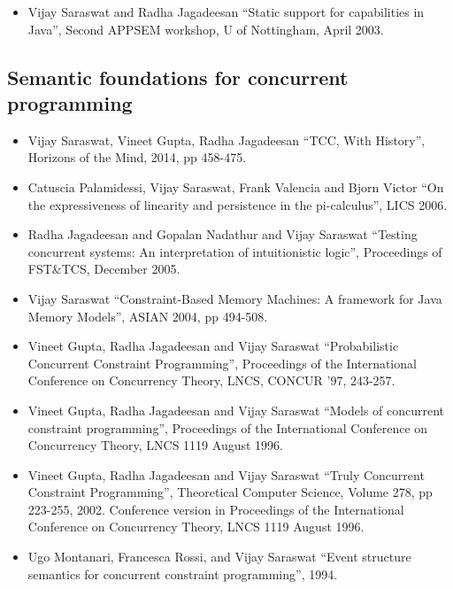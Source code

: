 \documentclass{article}
\begin{document}
\begin{itemize} 
\item Vijay Saraswat and Radha Jagadeesan ``Static support for
  capabilities in Java'', Second APPSEM workshop, U of Nottingham,
  April 2003. 
\end{itemize}

\subsection*{Semantic foundations for concurrent programming}
\begin{itemize} 
\item Vijay Saraswat, Vineet Gupta, Radha Jagadeesan ``TCC, With
  History'', Horizons of the Mind, 2014, pp 458-475.

\item Catuscia Palamidessi, Vijay Saraswat, Frank Valencia and Bjorn
Victor ``On the expressiveness of linearity and persistence in the
pi-calculus'', LICS 2006.

\item Radha Jagadeesan and Gopalan Nadathur and Vijay Saraswat
``Testing concurrent systems: An interpretation of intuitionistic
logic'', Proceedings of FST\&TCS, December 2005.

\item Vijay Saraswat ``Constraint-Based Memory Machines: A framework
for Java Memory Models'', ASIAN 2004, pp 494-508.

\item  Vineet Gupta, Radha Jagadeesan and Vijay Saraswat ``Probabilistic
  Concurrent Constraint Programming'', Proceedings of the
  International Conference on Concurrency Theory, LNCS, CONCUR '97,
  243-257.

\item  Vineet Gupta, Radha Jagadeesan and Vijay Saraswat ``Models
  of concurrent constraint programming'', Proceedings of the
  International Conference on Concurrency Theory, LNCS 1119 August
  1996.

\item Vineet Gupta, Radha Jagadeesan and Vijay Saraswat ``Truly
  Concurrent Constraint Programming'', Theoretical Computer Science,
  Volume 278, pp 223-255, 2002. Conference version in Proceedings of
  the International Conference on Concurrency Theory, LNCS 1119 August
  1996.

\item  Ugo Montanari, Francesca Rossi, and Vijay Saraswat ``Event
  structure semantics for concurrent constraint programming'',
  1994.  
  

\end{itemize}
\end{document}
